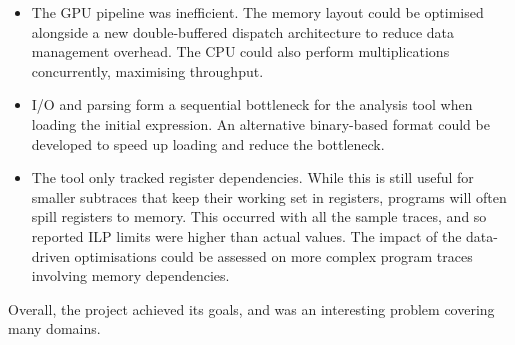 \begin{itemize}
  \item The GPU pipeline was inefficient. The memory layout could be optimised alongside a new double-buffered dispatch 
    architecture to reduce data management overhead. The CPU could also perform multiplications concurrently,
    maximising throughput.
  \item I/O and parsing form a sequential bottleneck for the analysis tool when loading the initial expression. 
    An alternative binary-based format could be developed to speed up loading and reduce the bottleneck.
  \item The tool only tracked register dependencies. While this is still useful for smaller subtraces that keep their 
    working set in registers, programs will often spill registers to memory. This occurred with all the sample traces,
    and so reported ILP limits were higher than actual values. The impact of the data-driven optimisations could be
    assessed on more complex program traces involving memory dependencies.
\end{itemize}

Overall, the project achieved its goals, and was an interesting problem covering many domains.
